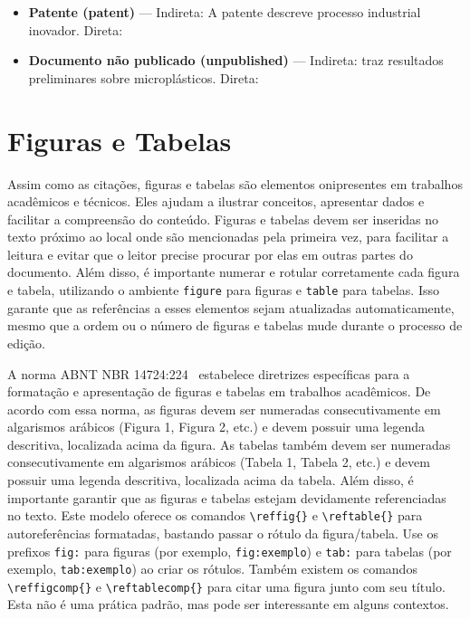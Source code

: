 \begin{itemize}
    \item \textbf{Patente (patent)} --- Indireta: A patente \textcite{patent1} descreve processo industrial inovador. Direta:\par

    \item \textbf{Documento não publicado (unpublished)} --- Indireta: \textcite{unpublished1} traz resultados preliminares sobre microplásticos. Direta:\par
\end{itemize}

\section{Figuras e Tabelas}\label{sec:figuras-tabelas}

Assim como as citações, figuras e tabelas são elementos onipresentes em trabalhos acadêmicos e
técnicos. Eles ajudam a ilustrar conceitos, apresentar dados e facilitar a compreensão do conteúdo.
Figuras e tabelas devem ser inseridas no texto próximo ao local onde são mencionadas pela primeira
vez, para facilitar a leitura e evitar que o leitor precise procurar por elas em outras partes do
documento. Além disso, é importante numerar e rotular corretamente cada figura e tabela, utilizando
o ambiente \texttt{figure} para figuras e \texttt{table} para tabelas. Isso garante que as referências
a esses elementos sejam atualizadas automaticamente, mesmo que a ordem ou o número de figuras e
tabelas mude durante o processo de edição.

A norma ABNT NBR 14724:224~\cite{nbr14724:2024} estabelece diretrizes específicas para a
formatação e apresentação de figuras e tabelas em trabalhos acadêmicos. De acordo com essa norma,
as figuras devem ser numeradas consecutivamente em algarismos arábicos (Figura 1, Figura 2, etc.) e
devem possuir uma legenda descritiva, localizada acima da figura. As tabelas também devem ser
numeradas consecutivamente em algarismos arábicos (Tabela 1, Tabela 2, etc.) e devem possuir uma
legenda descritiva, localizada acima da tabela. Além disso, é importante garantir que as figuras e
tabelas estejam devidamente referenciadas no texto. Este modelo oferece os comandos
\verb|\reffig{}| e \verb|\reftable{}| para autoreferências formatadas, bastando passar o rótulo da figura/tabela. Use os prefixos \texttt{fig:} para figuras (por exemplo, \texttt{fig:exemplo})
e \texttt{tab:} para tabelas (por exemplo, \texttt{tab:exemplo}) ao criar os rótulos. Também existem
os comandos \verb|\reffigcomp{}| e \verb|\reftablecomp{}| para citar uma figura junto com seu título. Esta não é uma prática padrão, mas pode ser interessante em alguns contextos.

